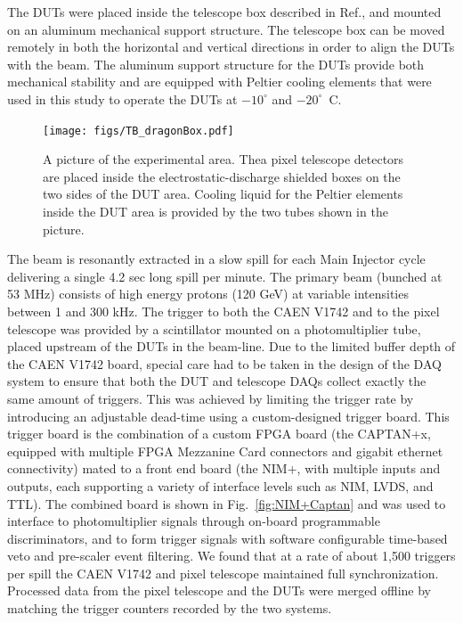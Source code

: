 \documentclass[preprint,1p]{elsarticle}
\begin{document}
The DUTs were placed inside the telescope box described in
Ref.\cite{KWAN2016162}, and mounted on an aluminum mechanical support structure.
The telescope box can be moved remotely in both the horizontal and vertical
directions in order to align the DUTs with the beam. The aluminum support
structure for the DUTs provide both mechanical stability and are
equipped with Peltier cooling elements that were used in this study to operate
the DUTs at $-10^{\circ}$ and $-20^{\circ}$~C.

\begin{figure}[htbp] 
\centering
\texttt{[image: figs/TB\_dragonBox.pdf]} 
\caption{A picture of the experimental area. Thea pixel telescope detectors are placed inside the 
electrostatic-discharge shielded boxes on the two sides of the DUT area. Cooling liquid for 
the Peltier elements inside the DUT area is provided by the two tubes shown in the picture.} 
\label{fig:DragonBox} 
\end{figure} 


The beam is resonantly extracted in a slow spill for each Main Injector cycle
delivering a single 4.2 sec long spill per minute. The primary beam (bunched at
53 MHz) consists of high energy protons (120 GeV) at variable intensities
between 1 and 300 kHz. The trigger to both the CAEN V1742 and to the pixel
telescope was provided by a scintillator mounted on a photomultiplier tube,
placed upstream of the DUTs in the beam-line. Due to the limited buffer depth of
the CAEN V1742 board, special care had to be taken in the design of the DAQ
system to ensure that both the DUT and telescope DAQs collect exactly the same
amount of triggers. This was achieved by limiting the trigger rate by
introducing an adjustable dead-time using a custom-designed trigger board. This
trigger board is the combination of a custom FPGA board (the CAPTAN+x, equipped
with multiple FPGA Mezzanine Card connectors and gigabit ethernet connectivity)
mated to a front end board (the NIM+, with multiple inputs and outputs, each
supporting a variety of interface levels such as NIM, LVDS, and TTL). The
combined board is shown in Fig.~\ref{fig:NIM+Captan} and was used to interface to
photomultiplier signals through on-board programmable discriminators, and to form
trigger signals with software configurable time-based veto and pre-scaler event
filtering. We found that at a rate of about 1,500 triggers per spill the CAEN
V1742 and pixel telescope maintained full synchronization. Processed data
from the pixel telescope and the DUTs were merged offline by matching the
trigger counters recorded by the two systems.
\end{document}
